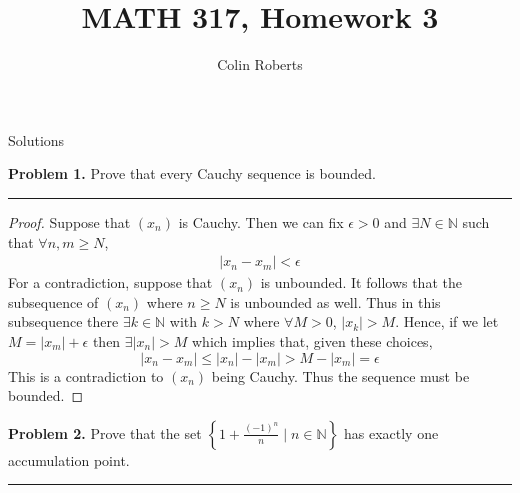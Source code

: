 \documentclass[leqno]{article}
\author{Colin Roberts}
\title{MATH 317, Homework 3}
\theoremstyle{nonumberplain}
\newtheorem{proof}{Proof}
\begin{document}
\maketitle
\begin{large}
\begin{center}
Solutions
\end{center}
\end{large}
\pagebreak

\noindent\textbf{Problem 1.} Prove that every Cauchy sequence is bounded.

\noindent\rule[0.5ex]{\linewidth}{1pt}

\begin{proof}
Suppose that $(x_n)$ is Cauchy.  Then we can fix $\epsilon > 0$ and $\exists N \in \mathbb{N}$ such that $\forall n,m \geq N$, 
\begin{align*}
|x_n - x_m|<\epsilon
\end{align*}
For a contradiction, suppose that $(x_n)$ is unbounded.  It follows that the subsequence of $(x_n)$ where $n \geq N$ is unbounded as well.  Thus in this subsequence there $\exists k \in \mathbb{N}$ with $k>N$ where $\forall M>0$, $|x_k| >M$. Hence, if we let $M=|x_m|+\epsilon$ then $\exists |x_n| >M$ which implies that, given these choices,
\[
|x_n-x_m|\leq |x_n|-|x_m| > M-|x_m|=\epsilon
\]
This is a contradiction to $(x_n)$ being Cauchy. Thus the sequence must be bounded.
\end{proof}


\pagebreak



\noindent\textbf{Problem 2.} Prove that the set $\left\{1+\frac{(-1)^n}{n} \mid n \in \mathbb{N}\right\}$ has exactly one accumulation point.

\noindent\rule[0.5ex]{\linewidth}{1pt}
\end{document}
